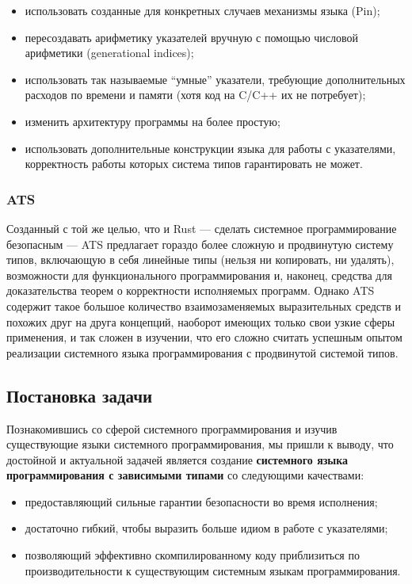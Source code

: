 \documentclass[12pt]{article}
\begin{document}
\begin{itemize}
  \item использовать созданные для конкретных случаев механизмы языка (Pin);
  \item пересоздавать арифметику указателей вручную с помощью числовой
    арифметики (generational indices);
  \item использовать так называемые ``умные'' указатели, требующие
    дополнительных расходов по времени и памяти (хотя код на C/C++ их не
    потребует);
  \item изменить архитектуру программы на более простую;
  \item использовать дополнительные конструкции языка для работы с указателями,
    корректность работы которых система типов гарантировать не может.
\end{itemize}

\subsubsection{ATS}

Созданный с той же целью, что и Rust --- сделать системное программирование
безопасным --- ATS предлагает гораздо более сложную и продвинутую систему типов,
включающую в себя линейные типы (нельзя ни копировать, ни удалять), возможности
для функционального программирования и, наконец, средства для доказательства
теорем о корректности исполняемых программ. Однако ATS содержит такое большое
количество взаимозаменяемых выразительных средств и похожих друг на друга
концепций, наоборот имеющих только свои узкие сферы применения, и так сложен в
изучении, что его сложно считать успешным опытом реализации системного языка
программирования с продвинутой системой типов.

\subsection{Постановка задачи}

Познакомившись со сферой системного программирования и изучив существующие языки
системного программирования, мы пришли к выводу, что достойной и актуальной
задачей является создание \textbf{системного языка программирования с зависимыми
типами} со следующими качествами:

\begin{itemize}
  \item предоставляющий сильные гарантии безопасности во время исполнения;
  \item достаточно гибкий, чтобы выразить больше идиом в работе с указателями;
  \item позволяющий эффективно скомпилированному коду приблизиться по
    производительности к существующим системным языкам программирования.
\end{itemize}
\end{document}
